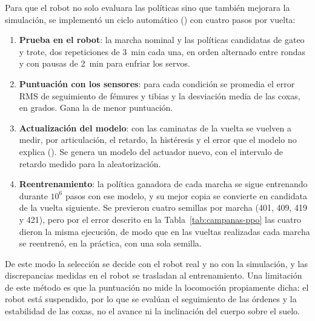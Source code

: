 Para que el robot no solo evaluara las políticas sino que también mejorara la
simulación, se implementó un ciclo automático () con
cuatro pasos por vuelta:
\begin{enumerate}
    \item \textbf{Prueba en el robot}: la marcha nominal y las políticas
    candidatas de gateo y trote, dos repeticiones de 3~min cada una, en orden
    alternado entre rondas y con pausas de 2~min para enfriar los servos.
    \item \textbf{Puntuación con los sensores}: para cada condición se promedia
    el error RMS de seguimiento de fémures y tibias y la desviación media de las
    coxas, en grados. Gana la de menor puntuación.
    \item \textbf{Actualización del modelo}: con las caminatas de la vuelta se
    vuelven a medir, por articulación, el retardo, la histéresis y el error que
    el modelo no explica (). Se genera un modelo
    del actuador nuevo, con el intervalo de retardo medido para la
    aleatorización.
    \item \textbf{Reentrenamiento}: la política ganadora de cada marcha se sigue
    entrenando durante $10^6$ pasos con ese modelo, y su mejor copia se
    convierte en candidata de la vuelta siguiente. Se previeron cuatro semillas
    por marcha (401, 409, 419 y 421), pero por el error descrito en la
    Tabla~\ref{tab:campanas-ppo} las cuatro dieron la misma ejecución, de modo
    que en las vueltas realizadas cada marcha se reentrenó, en la práctica, con
    una sola semilla.
\end{enumerate}
De este modo la selección se decide con el robot real y no con la simulación, y
las discrepancias medidas en el robot se trasladan al entrenamiento. Una
limitación de este método es que la puntuación no mide la locomoción
propiamente dicha: el robot está suspendido, por lo que se evalúan el
seguimiento de las órdenes y la estabilidad de las coxas, no el avance ni la
inclinación del cuerpo sobre el suelo.
